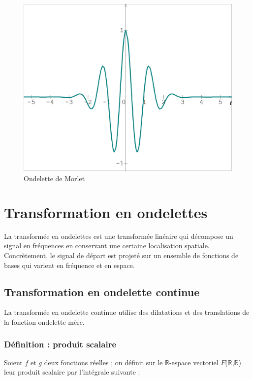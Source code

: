 \documentclass{article}
\begin{document}
\begin{figure}[!h]
\centering
\includegraphics[scale=0.2]{morlet.png}
\caption{Ondelette de Morlet}
\label{morlet}
\end{figure}

\pagebreak

\section{Transformation en ondelettes}

La transformée en ondelettes est une transformée linéaire qui décompose un signal en fréquences en conservant une certaine localisation spatiale. Concrètement, le signal de départ est projeté sur un ensemble de fonctions de bases qui varient en fréquence et en espace. 

\subsection{Transformation en ondelette continue}

La transformée en ondelette continue utilise des dilatations et des translations de la fonction ondelette mère. 

\subsubsection*{Définition : produit scalaire}

Soient $f$ et $g$ deux fonctions réelles ; on définit sur le $\mathbb{R}$-espace vectoriel $F$($\mathbb{R}$,$\mathbb{R}$) leur produit scalaire par l’intégrale suivante : \\
\end{document}

